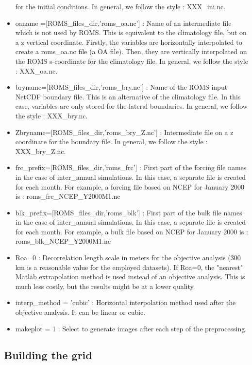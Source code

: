 \begin{itemize}
for the initial conditions. In general, we follow the style : XXX\_ini.nc.
\item oaname =[ROMS\_files\_dir,'roms\_oa.nc'] : Name of an intermediate file which is not
used by ROMS. This is equivalent to the climatology file, but on a z vertical coordinate.
Firstly, the variables are horizontally interpolated to create a roms\_oa.nc file (a OA file). 
Then, they are vertically interpolated on the ROMS s-coordinate for the climatology
file. In general, we follow the style : XXX\_oa.nc.
\item bryname=[ROMS\_files\_dir,'roms\_bry.nc'] : Name of the ROMS input NetCDF boundary file.
This is an alternative of the climatology file. In this case, variables are only stored for 
the lateral boundaries. In general, we follow the style : XXX\_bry.nc.
\item Zbryname=[ROMS\_files\_dir,'roms\_bry\_Z.nc'] : Intermediate file on a z coordinate
for the boundary file. In general, we follow the style : XXX\_bry\_Z.nc.
\item frc\_prefix=[ROMS\_files\_dir,'roms\_frc'] : First part of the forcing file names in
the case of inter\_annual simulations. In this case, a separate file is created for each month.
For example, a forcing file based on NCEP for January 2000 is : roms\_frc\_NCEP\_Y2000M1.nc
\item blk\_prefix=[ROMS\_files\_dir,'roms\_blk'] : First part of the bulk file names in
the case of inter\_annual simulations. In this case, a separate file is created for each month.
For example, a bulk file based on NCEP for January 2000 is : roms\_blk\_NCEP\_Y2000M1.nc
%
\item Roa=0 : Decorrelation length scale in meters for the objective analysis (300 km
is a reasonable value for the employed datasets). If Roa=0, the "nearest" Matlab extrapolation
method is used instead of an objective analysis. This is much less costly, but the 
results might be at a lower quality.
\item interp\_method = 'cubic' : Horizontal interpolation method used after the objective 
analysis. It can be linear or cubic.
\item makeplot     = 1 : Select to generate images after each step of the preprocessing.
\end{itemize}


\subsection{Building the grid}

